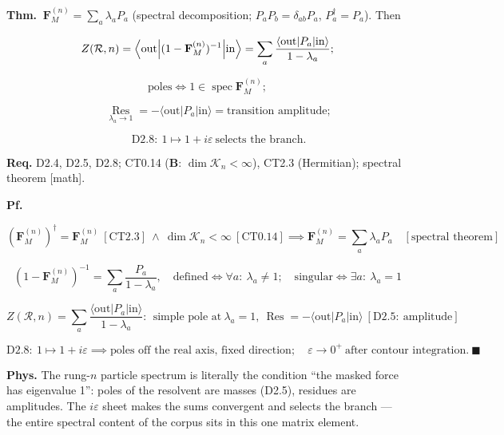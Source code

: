\begin{theorem}\label{tag:CT2-5}
\textbf{Thm.} $\ \mathbf F_M^{(n)}=\sum_a\lambda_aP_a$ (spectral decomposition; $P_aP_b=\delta_{ab}P_a$, $P_a^\dagger=P_a$). Then

\[
Z(\mathcal R,n)=\Bigl\langle\mathrm{out}\Bigl|(1-\mathbf F_M^{(n)})^{-1}\Bigr|\mathrm{in}\Bigr\rangle=\sum_a\frac{\langle\mathrm{out}|P_a|\mathrm{in}\rangle}{1-\lambda_a};
\]

\[
\text{poles}\iff1\in\operatorname{spec}\mathbf F_M^{(n)};
\]

\[
\qquad \operatorname*{Res}_{\lambda_a\to1}=-\langle\mathrm{out}|P_a|\mathrm{in}\rangle=\text{transition amplitude};
\]

\[
\qquad \mathrm{D2.8}:\ 1\mapsto1+i\varepsilon\ \text{selects the branch}.
\]

\textbf{Req.} D2.4, D2.5, D2.8; CT0.14 (\textbf{B}: $\dim\mathcal K_n<\infty$), CT2.3 (Hermitian); spectral theorem [math].

\textbf{Pf.}

\[
(\mathbf F_M^{(n)})^\dagger=\mathbf F_M^{(n)}\ [\mathrm{CT2.3}]\ \wedge\ \dim\mathcal K_n<\infty\ [\mathrm{CT0.14}]\implies\mathbf F_M^{(n)}=\sum_a\lambda_aP_a\quad[\text{spectral theorem}]
\]

\[
(1-\mathbf F_M^{(n)})^{-1}=\sum_a\frac{P_a}{1-\lambda_a},\quad\text{defined}\iff\forall a:\ \lambda_a\ne1;\quad\text{singular}\iff\exists a:\ \lambda_a=1
\]

\[
Z(\mathcal R,n)=\sum_a\frac{\langle\mathrm{out}|P_a|\mathrm{in}\rangle}{1-\lambda_a}:\ \ \text{simple pole at}\ \lambda_a=1,\ \operatorname{Res}=-\langle\mathrm{out}|P_a|\mathrm{in}\rangle\ [\mathrm{D2.5}:\ \text{amplitude}]
\]

\[
\mathrm{D2.8}:\ 1\mapsto1+i\varepsilon\implies\text{poles off the real axis, fixed direction};\quad\varepsilon\to0^+\ \text{after contour integration}.\ \blacksquare
\]

\textbf{Phys.} The rung-$n$ particle spectrum is literally the condition “the masked force has eigenvalue 1”: poles of the resolvent are masses (D2.5), residues are amplitudes. The $i\varepsilon$ sheet makes the sums convergent and selects the branch — the entire spectral content of the corpus sits in this one matrix element.

\end{theorem}

